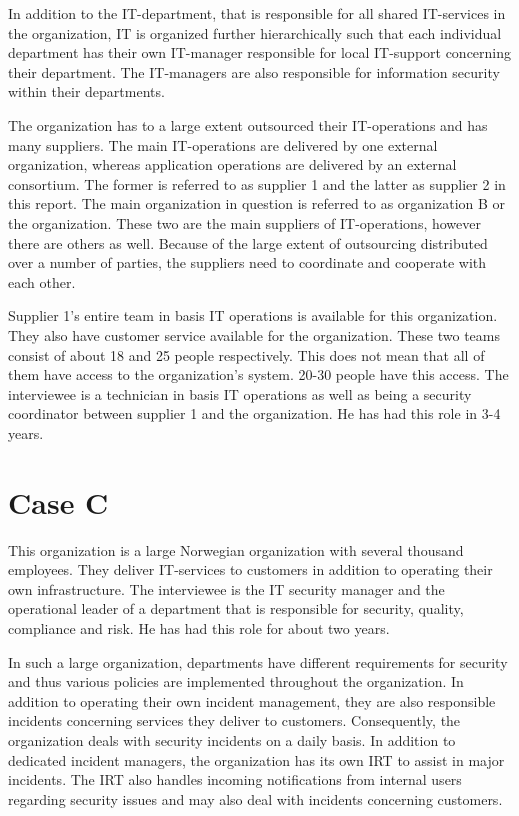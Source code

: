 In addition to the IT-department, that is responsible for all shared IT-services in the organization, IT is organized further hierarchically such that each individual department has their own IT-manager responsible for local IT-support concerning their department. The IT-managers are also responsible for information security within their departments.

The organization has to a large extent outsourced their IT-operations and has many suppliers. The main IT-operations are delivered by one external organization, whereas application operations are delivered by an external consortium. The former is referred to as supplier 1 and the latter as supplier 2 in this report. The main organization in question is referred to as organization B or the organization. These two are the main suppliers of IT-operations, however there are others as well. Because of the large extent of outsourcing distributed over a number of parties, the suppliers need to coordinate and cooperate with each other.

Supplier 1's entire team in basis IT operations is available for this organization. They also have customer service available for the organization. These two teams consist of about 18 and 25 people respectively. This does not mean that all of them have access to the organization's system. 20-30 people have this access. The interviewee is a technician in basis IT operations as well as being a security coordinator between supplier 1 and the organization. He has had this role in 3-4 years.


\section{Case C}
This organization is a large Norwegian organization with several thousand employees. They deliver IT-services to customers in addition to operating their own infrastructure. The interviewee is the IT security manager  and the operational leader of a department that is responsible for security, quality, compliance and risk. He has had this role for about two years.

In such a large organization, departments have different requirements for security and thus various policies are implemented throughout the organization. In addition to operating their own incident management, they are also responsible incidents concerning services they deliver to customers. Consequently, the organization deals with security incidents on a daily basis. In addition to dedicated incident managers, the organization has its own \ac{IRT} to assist in major incidents. The \ac{IRT} also handles incoming notifications from internal users regarding security issues and may also deal with incidents concerning customers. 